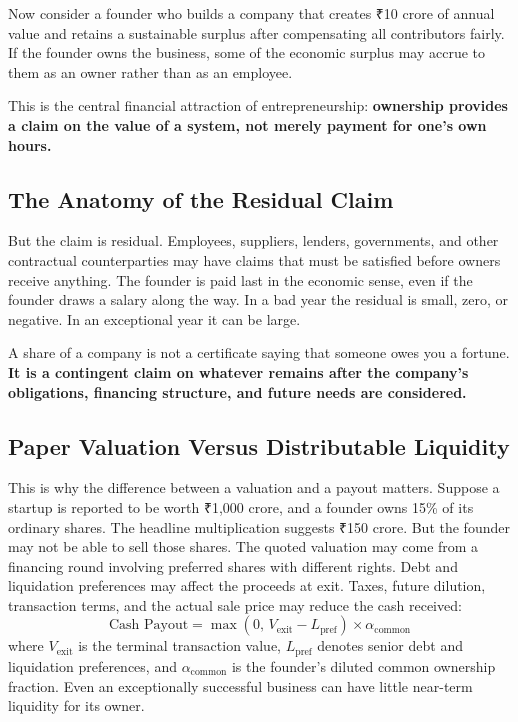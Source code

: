 Now consider a founder who builds a company that creates ₹10 crore of annual value and retains a sustainable surplus after compensating all contributors fairly. If the founder owns the business, some of the economic surplus may accrue to them as an owner rather than as an employee.

This is the central financial attraction of entrepreneurship: \textbf{ownership provides a claim on the value of a system, not merely payment for one's own hours.}

\subsection{The Anatomy of the Residual Claim}

But the claim is residual. Employees, suppliers, lenders, governments, and other contractual counterparties may have claims that must be satisfied before owners receive anything. The founder is paid last in the economic sense, even if the founder draws a salary along the way. In a bad year the residual is small, zero, or negative. In an exceptional year it can be large.

A share of a company is not a certificate saying that someone owes you a fortune. \textbf{It is a contingent claim on whatever remains after the company's obligations, financing structure, and future needs are considered.}

\subsection{Paper Valuation Versus Distributable Liquidity}

This is why the difference between a valuation and a payout matters. Suppose a startup is reported to be worth ₹1,000 crore, and a founder owns 15\% of its ordinary shares. The headline multiplication suggests ₹150 crore. But the founder may not be able to sell those shares. The quoted valuation may come from a financing round involving preferred shares with different rights. Debt and liquidation preferences may affect the proceeds at exit. Taxes, future dilution, transaction terms, and the actual sale price may reduce the cash received:
\begin{equation}
  \text{Cash Payout} = \max\left(0, \, V_{\text{exit}} - L_{\text{pref}}\right) \times \alpha_{\text{common}} \label{eq:exit-proceeds}
\end{equation}
where $V_{\text{exit}}$ is the terminal transaction value, $L_{\text{pref}}$ denotes senior debt and liquidation preferences, and $\alpha_{\text{common}}$ is the founder's diluted common ownership fraction. Even an exceptionally successful business can have little near-term liquidity for its owner.

